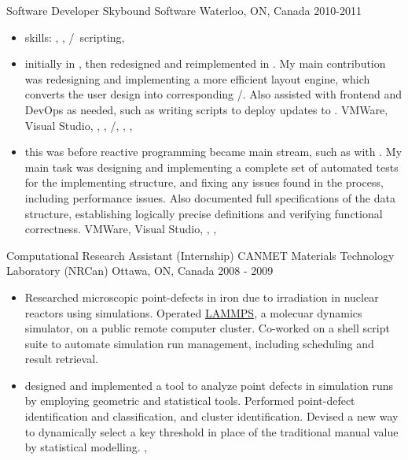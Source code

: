\cventry
  {Software Developer} %
  {Skybound Software} %
  {Waterloo, ON, Canada} %
  {2010-2011} %
  {
    \begin{itemize} %
      \liststyle
      \item {skills: \rfcsharp, \rftypescript, \rfhtml/\rfcss \rfbash \ scripting, \rfaws}
      \item{ initially in \rfcsharp, then redesigned and reimplemented in \rftypescript. 
      \tgsubitem My main contribution was redesigning and implementing a more efficient layout engine, which converts the user design into corresponding \rfhtml/\rfcss.
      \tgsubitem Also assisted with frontend and DevOps as needed, such as writing \rfbash scripts to deploy updates to \rfaws.
      \tgskills VMWare, Visual Studio, \rfcsharp, \rftypescript, \rfhtml/\rfcss, \rfmercurial, \rfbash, \rfaws
      }

      \item{
      this was before reactive programming became main stream, such as with \rfreact.
      \tgsubitem My main task was designing and implementing a complete set of automated tests for the implementing structure, and fixing any issues found in the process, including performance issues. 
      \tgsubitem Also documented full specifications of the data structure, establishing logically precise definitions and verifying functional correctness.
      \tgskills VMWare, Visual Studio, \rfcsharp, \rflatex, \rfmercurial

      }
    \end{itemize}
  }

\cventry
  {Computational Research Assistant (Internship)} %
  {CANMET Materials Technology Laboratory (NRCan)} %
  {Ottawa, ON, Canada} %
  {2008 - 2009} %
  {
    \begin{itemize} %
      \liststyle
      \item {
        Researched microscopic point-defects in iron due to irradiation in nuclear reactors using simulations.
        Operated \href{https://www.lammps.org/}{LAMMPS}, a molecuar dynamics simulator, on a public remote computer cluster. 
        Co-worked on a shell script suite to automate simulation run management, including scheduling and result retrieval.
      }
    \item{
       designed and implemented a tool to analyze point defects in simulation runs by employing geometric and statistical tools. 
      Performed point-defect identification and classification, and cluster identification.
      Devised a new way to dynamically select a key threshold in place of the traditional manual value by statistical modelling.
\tgskills \rffortran, \rfclang
    }
    \end{itemize}
  }



